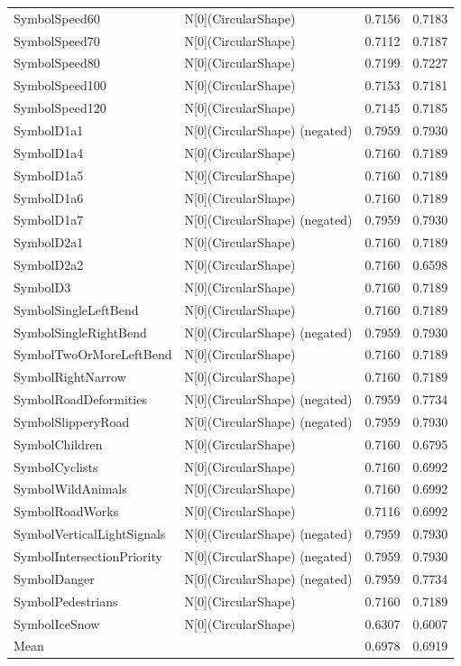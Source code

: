 \begin{tabular}{llll}
SymbolSpeed60 & N[0](CircularShape) & 0.7156 & 0.7183 \\
SymbolSpeed70 & N[0](CircularShape) & 0.7112 & 0.7187 \\
SymbolSpeed80 & N[0](CircularShape) & 0.7199 & 0.7227 \\
SymbolSpeed100 & N[0](CircularShape) & 0.7153 & 0.7181 \\
SymbolSpeed120 & N[0](CircularShape) & 0.7145 & 0.7185 \\
SymbolD1a1 & N[0](CircularShape) (negated) & 0.7959 & 0.7930 \\
SymbolD1a4 & N[0](CircularShape) & 0.7160 & 0.7189 \\
SymbolD1a5 & N[0](CircularShape) & 0.7160 & 0.7189 \\
SymbolD1a6 & N[0](CircularShape) & 0.7160 & 0.7189 \\
SymbolD1a7 & N[0](CircularShape) (negated) & 0.7959 & 0.7930 \\
SymbolD2a1 & N[0](CircularShape) & 0.7160 & 0.7189 \\
SymbolD2a2 & N[0](CircularShape) & 0.7160 & 0.6598 \\
SymbolD3 & N[0](CircularShape) & 0.7160 & 0.7189 \\
SymbolSingleLeftBend & N[0](CircularShape) & 0.7160 & 0.7189 \\
SymbolSingleRightBend & N[0](CircularShape) (negated) & 0.7959 & 0.7930 \\
SymbolTwoOrMoreLeftBend & N[0](CircularShape) & 0.7160 & 0.7189 \\
SymbolRightNarrow & N[0](CircularShape) & 0.7160 & 0.7189 \\
SymbolRoadDeformities & N[0](CircularShape) (negated) & 0.7959 & 0.7734 \\
SymbolSlipperyRoad & N[0](CircularShape) (negated) & 0.7959 & 0.7930 \\
SymbolChildren & N[0](CircularShape) & 0.7160 & 0.6795 \\
SymbolCyclists & N[0](CircularShape) & 0.7160 & 0.6992 \\
SymbolWildAnimals & N[0](CircularShape) & 0.7160 & 0.6992 \\
SymbolRoadWorks & N[0](CircularShape) & 0.7116 & 0.6992 \\
SymbolVerticalLightSignals & N[0](CircularShape) (negated) & 0.7959 & 0.7930 \\
SymbolIntersectionPriority & N[0](CircularShape) (negated) & 0.7959 & 0.7930 \\
SymbolDanger & N[0](CircularShape) (negated) & 0.7959 & 0.7734 \\
SymbolPedestrians & N[0](CircularShape) & 0.7160 & 0.7189 \\
SymbolIceSnow & N[0](CircularShape) & 0.6307 & 0.6007 \\
Mean &  & 0.6978 & 0.6919 \\
\bottomrule
\end{tabular}

